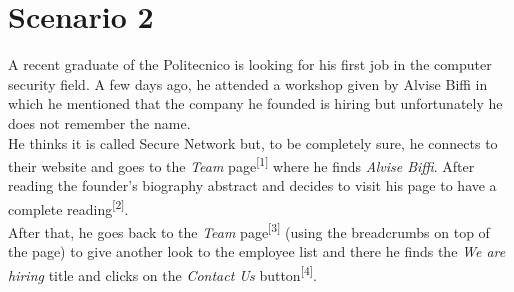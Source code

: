 \documentclass[12pt]{report}
\begin{document}
\section{Scenario 2}
A recent graduate of the Politecnico is looking for his first job in the computer security field.
A few days ago, he attended a workshop given by Alvise Biffi in which he mentioned that the company he founded is hiring but unfortunately he does not remember the name.\\
\noindent
He thinks it is called Secure Network but, to be completely sure, he connects to their website and goes to the \emph{Team} page\textsuperscript{[1]} where he finds \emph{Alvise Biffi}.
After reading the founder's biography abstract and decides to visit his page to have a complete reading\textsuperscript{[2]}. 
\\
\noindent
After that, he goes back to the \emph{Team} page\textsuperscript{[3]} (using the breadcrumbs on top of the page) to give another look to the employee list and there he finds the \emph{We are hiring} title and clicks on the \emph{Contact Us} button\textsuperscript{[4]}.
\end{document}
